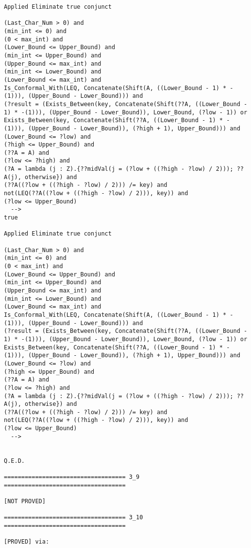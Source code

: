 \begin{lstlisting}[language=resolve]
Applied Eliminate true conjunct

(Last_Char_Num > 0) and
(min_int <= 0) and
(0 < max_int) and
(Lower_Bound <= Upper_Bound) and
(min_int <= Upper_Bound) and
(Upper_Bound <= max_int) and
(min_int <= Lower_Bound) and
(Lower_Bound <= max_int) and
Is_Conformal_With(LEQ, Concatenate(Shift(A, ((Lower_Bound - 1) * -(1))), (Upper_Bound - Lower_Bound))) and
(?result = (Exists_Between(key, Concatenate(Shift(??A, ((Lower_Bound - 1) * -(1))), (Upper_Bound - Lower_Bound)), Lower_Bound, (?low - 1)) or Exists_Between(key, Concatenate(Shift(??A, ((Lower_Bound - 1) * -(1))), (Upper_Bound - Lower_Bound)), (?high + 1), Upper_Bound))) and
(Lower_Bound <= ?low) and
(?high <= Upper_Bound) and
(??A = A) and
(?low <= ?high) and
(?A = lambda (j : Z).{??midVal(j = (?low + ((?high - ?low) / 2))); ??A(j), otherwise}) and
(??A((?low + ((?high - ?low) / 2))) /= key) and
not(LEQ(??A((?low + ((?high - ?low) / 2))), key)) and
(?low <= Upper_Bound)
  -->
true

Applied Eliminate true conjunct

(Last_Char_Num > 0) and
(min_int <= 0) and
(0 < max_int) and
(Lower_Bound <= Upper_Bound) and
(min_int <= Upper_Bound) and
(Upper_Bound <= max_int) and
(min_int <= Lower_Bound) and
(Lower_Bound <= max_int) and
Is_Conformal_With(LEQ, Concatenate(Shift(A, ((Lower_Bound - 1) * -(1))), (Upper_Bound - Lower_Bound))) and
(?result = (Exists_Between(key, Concatenate(Shift(??A, ((Lower_Bound - 1) * -(1))), (Upper_Bound - Lower_Bound)), Lower_Bound, (?low - 1)) or Exists_Between(key, Concatenate(Shift(??A, ((Lower_Bound - 1) * -(1))), (Upper_Bound - Lower_Bound)), (?high + 1), Upper_Bound))) and
(Lower_Bound <= ?low) and
(?high <= Upper_Bound) and
(??A = A) and
(?low <= ?high) and
(?A = lambda (j : Z).{??midVal(j = (?low + ((?high - ?low) / 2))); ??A(j), otherwise}) and
(??A((?low + ((?high - ?low) / 2))) /= key) and
not(LEQ(??A((?low + ((?high - ?low) / 2))), key)) and
(?low <= Upper_Bound)
  -->


Q.E.D.

=================================== 3_9 ===================================

[NOT PROVED]

=================================== 3_10 ===================================

[PROVED] via:


\end{lstlisting}
